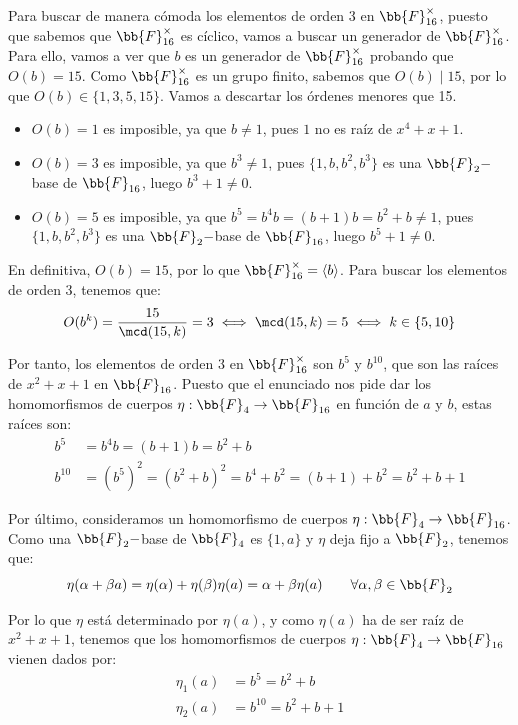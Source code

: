 \begin{ejercicio}
    Para buscar de manera cómoda los elementos de orden 3 en $\bb{F}_{16}^\times$, puesto que sabemos que $\bb{F}_{16}^\times$ es cíclico, vamos a buscar un generador de $\bb{F}_{16}^\times$. Para ello, vamos a ver que $b$ es un generador de $\bb{F}_{16}^\times$ probando que $O(b) = 15$. Como $\bb{F}_{16}^\times$ es un grupo finito, sabemos que $O(b)\mid 15$, por lo que $O(b) \in \{1,3,5,15\}$. Vamos a descartar los órdenes menores que 15.
    \begin{itemize}
        \item $O(b) = 1$ es imposible, ya que $b\neq 1$, pues $1$ no es raíz de $x^4+x+1$.
        \item $O(b) = 3$ es imposible, ya que $b^3\neq 1$, pues $\{1,b,b^2, b^3\}$ es una $\bb{F}_2-$base de $\bb{F}_{16}$, luego $b^3+1\neq 0$.
        \item $O(b) = 5$ es imposible, ya que $b^5=b^4b = (b+1)b = b^2+b \neq 1$, pues $\{1,b,b^2, b^3\}$ es una $\bb{F}_2-$base de $\bb{F}_{16}$, luego $b^5+1\neq 0$.
    \end{itemize}
    En definitiva, $O(b) = 15$, por lo que $\bb{F}_{16}^\times = \langle b \rangle $. Para buscar los elementos de orden 3, tenemos que:
    \begin{equation*}
        O(b^k) = \frac{15}{\mcd(15,k)} = 3\iff \mcd(15,k) = 5 \iff k \in \{5,10\}
    \end{equation*}

    Por tanto, los elementos de orden 3 en $\bb{F}_{16}^\times$ son $b^5$ y $b^{10}$, que son las raíces de $x^2+x+1$ en $\bb{F}_{16}$. Puesto que el enunciado nos pide dar los homomorfismos de cuerpos $\eta:\bb{F}_4\to \bb{F}_{16}$ en función de $a$ y $b$, estas raíces son:
    \begin{align*}
        b^5 &= b^4b = (b+1)b = b^2+b \\
        b^{10} &= {(b^5)}^2 = {(b^2+b)}^2 = b^4+b^2 = (b+1)+b^2 = b^2+b+1
    \end{align*}

    Por último, consideramos un homomorfismo de cuerpos $\eta:\bb{F}_4\to \bb{F}_{16}$. Como una $\bb{F}_2-$base de $\bb{F}_4$ es $\{1,a\}$ y $\eta$ deja fijo a $\bb{F}_2$, tenemos que:
    \begin{equation*}
        \eta(\alpha+\beta a) = \eta(\alpha)+\eta(\beta)\eta(a) = \alpha + \beta \eta(a)\qquad \forall \alpha,\beta\in \bb{F}_2
    \end{equation*}

    Por lo que $\eta$ está determinado por $\eta(a)$, y como $\eta(a)$ ha de ser raíz de $x^2+x+1$, tenemos que los homomorfismos de cuerpos $\eta:\bb{F}_4\to \bb{F}_{16}$ vienen dados por:
    \begin{align*}
        \eta_1(a) &= b^5 = b^2+b \\
        \eta_2(a) &= b^{10} = b^2+b+1
    \end{align*}





\end{ejercicio}
